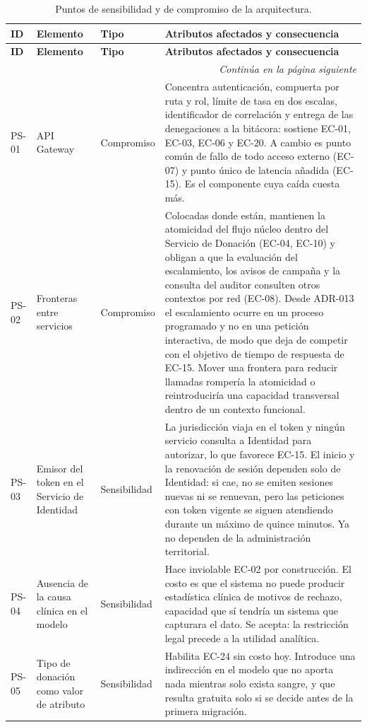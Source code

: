 \documentclass[11pt,a4paper]{article}
\newcommand{\contlinea}[1]{\multicolumn{#1}{r}{\footnotesize\itshape Continúa en la página siguiente}}
\begin{document}
\begin{longtable}{L{1.2cm} L{3.6cm} L{2.0cm} L{7.4cm}}
\caption{Puntos de sensibilidad y de compromiso de la arquitectura.}\label{tab:sensibilidad}\\
\toprule
\textbf{ID} & \textbf{Elemento} & \textbf{Tipo} & \textbf{Atributos afectados y consecuencia} \\
\midrule
\endfirsthead
\toprule
\textbf{ID} & \textbf{Elemento} & \textbf{Tipo} & \textbf{Atributos afectados y consecuencia} \\
\midrule
\endhead
\midrule
\contlinea{4} \\
\endfoot
\bottomrule
\endlastfoot
PS-01 & API Gateway & Compromiso & Concentra autenticación, compuerta por ruta y rol, límite de tasa en dos escalas, identificador de correlación y entrega de las denegaciones a la bitácora: sostiene EC-01, EC-03, EC-06 y EC-20. A cambio es punto común de fallo de todo acceso externo (EC-07) y punto único de latencia añadida (EC-15). Es el componente cuya caída cuesta más. \\
PS-02 & Fronteras entre servicios & Compromiso & Colocadas donde están, mantienen la atomicidad del flujo núcleo dentro del Servicio de Donación (EC-04, EC-10) y obligan a que la evaluación del escalamiento, los avisos de campaña y la consulta del auditor consulten otros contextos por red (EC-08). Desde ADR-013 el escalamiento ocurre en un proceso programado y no en una petición interactiva, de modo que deja de competir con el objetivo de tiempo de respuesta de EC-15. Mover una frontera para reducir llamadas rompería la atomicidad o reintroduciría una capacidad transversal dentro de un contexto funcional. \\
PS-03 & Emisor del token en el Servicio de Identidad & Sensibilidad & La jurisdicción viaja en el token y ningún servicio consulta a Identidad para autorizar, lo que favorece EC-15. El inicio y la renovación de sesión dependen solo de Identidad: si cae, no se emiten sesiones nuevas ni se renuevan, pero las peticiones con token vigente se siguen atendiendo durante un máximo de quince minutos. Ya no dependen de la administración territorial. \\
PS-04 & Ausencia de la causa clínica en el modelo & Sensibilidad & Hace inviolable EC-02 por construcción. El costo es que el sistema no puede producir estadística clínica de motivos de rechazo, capacidad que sí tendría un sistema que capturara el dato. Se acepta: la restricción legal precede a la utilidad analítica. \\
PS-05 & Tipo de donación como valor de atributo & Sensibilidad & Habilita EC-24 sin costo hoy. Introduce una indirección en el modelo que no aporta nada mientras solo exista sangre, y que resulta gratuita solo si se decide antes de la primera migración. \\

\end{longtable}
\end{document}
